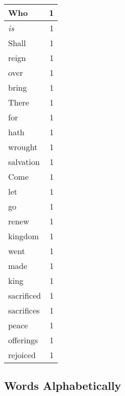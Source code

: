 \begin{center}
\begin{longtable}{l|r}
Who & 1 \\ \hline
\emph{is} & 1 \\ \hline
Shall & 1 \\ \hline
reign & 1 \\ \hline
over & 1 \\ \hline
bring & 1 \\ \hline
There & 1 \\ \hline
for & 1 \\ \hline
hath & 1 \\ \hline
wrought & 1 \\ \hline
salvation & 1 \\ \hline
Come & 1 \\ \hline
let & 1 \\ \hline
go & 1 \\ \hline
renew & 1 \\ \hline
kingdom & 1 \\ \hline
went & 1 \\ \hline
made & 1 \\ \hline
king & 1 \\ \hline
sacrificed & 1 \\ \hline
sacrifices & 1 \\ \hline
peace & 1 \\ \hline
offerings & 1 \\ \hline
rejoiced & 1 \\ \hline
\end{longtable}
\end{center}



\normalsize



\subsection{Words Alphabetically}

